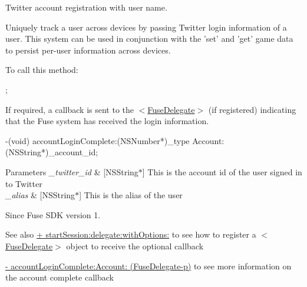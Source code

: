 Twitter account registration with user name. 

Uniquely track a user across devices by passing Twitter login information of a user. This system can be used in conjunction with the 'set' and 'get' game data to persist per-\/user information across devices.

To call this method\+:


\begin{DoxyCode}
;
\end{DoxyCode}


If required, a callback is sent to the $<$\hyperlink{protocol_fuse_delegate-p}{Fuse\+Delegate}$>$ (if registered) indicating that the Fuse system has received the login information.


\begin{DoxyCode}
-(void) accountLoginComplete:(NSNumber*)\_type Account:(NSString*)\_account\_id;
\end{DoxyCode}



\begin{DoxyParams}{Parameters}
{\em \+\_\+twitter\+\_\+id} & \mbox{[}N\+S\+String$\ast$\mbox{]} This is the account id of the user signed in to Twitter \\
\hline
{\em \+\_\+alias} & \mbox{[}N\+S\+String$\ast$\mbox{]} This is the alias of the user \\
\hline
\end{DoxyParams}
\begin{DoxySince}{Since}
Fuse S\+D\+K version 1. 
\end{DoxySince}
\begin{DoxySeeAlso}{See also}
\hyperlink{interface_fuse_s_d_k_adf7ed64a02b9540c9ded4b931ea4e400}{+ start\+Session\+:delegate\+:with\+Options\+:} to see how to register a $<$\hyperlink{protocol_fuse_delegate-p}{Fuse\+Delegate}$>$ object to receive the optional callback 

\hyperlink{protocol_fuse_delegate-p_a54a18530604a7ceeb0e9419fc7fa3345}{-\/ account\+Login\+Complete\+:\+Account\+: (\+Fuse\+Delegate-\/p)} to see more information on the account complete callback 
\end{DoxySeeAlso}
\hypertarget{interface_fuse_s_d_k_a11a92658dca5be9d79ca19a66bafb91e}{}
